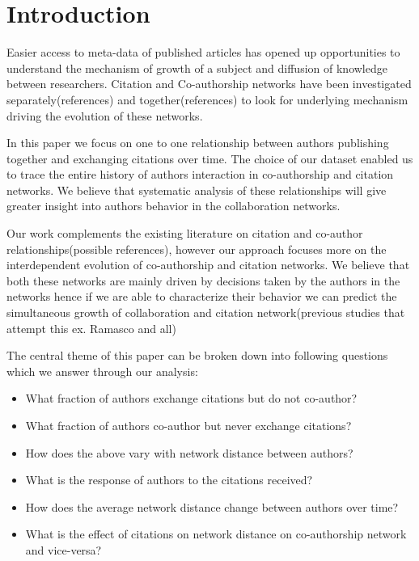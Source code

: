 \documentclass[aps, pre, twocolumn, nofootinbib]{revtex4-1}
\begin{document}
\section{Introduction}

Easier access to meta-data of published articles has opened up opportunities to understand the mechanism of growth of a subject and diffusion of knowledge between researchers. Citation and Co-authorship networks have been investigated separately(references) and together(references) to look for underlying mechanism driving the evolution of these networks.

In this paper we focus on one to one relationship between authors publishing together and exchanging citations over time. The choice of our dataset enabled us to trace the entire history of authors interaction in co-authorship and citation networks. We believe that systematic analysis of these relationships will give greater insight into authors behavior in the collaboration networks. 

Our work complements the existing literature on citation and co-author relationships(possible references), however our approach focuses more on the interdependent evolution of co-authorship and citation networks. We believe that both these networks are mainly driven by decisions taken by the authors in the networks hence if we are able to characterize their behavior we can predict the simultaneous growth of collaboration and citation network(previous studies that attempt this ex. Ramasco and all)

The central theme of this paper can be broken down into following questions which we answer through our analysis:

\begin{itemize}
	\item What fraction of authors exchange citations but do not co-author?
	\item What fraction of authors co-author but never exchange citations?
	\item How does the above vary with network distance between authors?
	\item What is the response of authors to the citations received?
	\item How does the average network distance change between authors over time?
	\item What is the effect of citations on network distance on co-authorship network and vice-versa?
\end{itemize}
\end{document}
